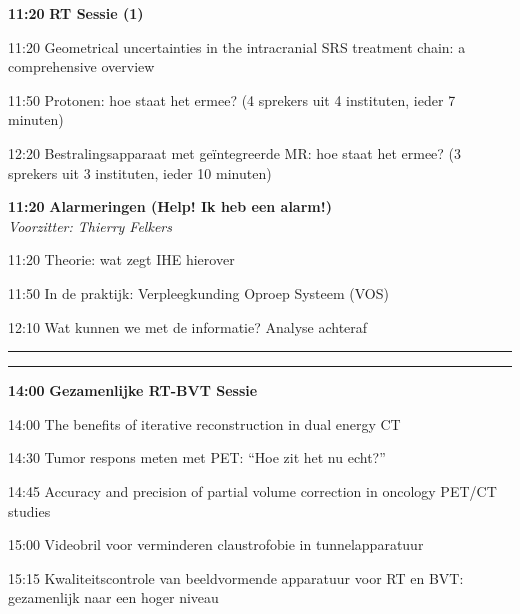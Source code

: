 \documentclass[a4paper,10pt]{report}
\begin{document}
\begin{multicols*}{3}
\begin{packed_enum}
\item[\textbf{11:20}] \textbf{RT Sessie (1)}
\item[11:20] Geometrical uncertainties in the intracranial SRS treatment chain: a comprehensive overview
\item[11:50] Protonen: hoe staat het ermee? (4 sprekers uit 4 instituten, ieder 7 minuten)
\item[12:20] Bestralingsapparaat met geïntegreerde MR: hoe staat het ermee? (3 sprekers uit 3 instituten, ieder 10 minuten)
\end{packed_enum} %

\vfill

\begin{packed_enum}
\item[\textbf{11:20}] \textbf{Alarmeringen (Help! Ik heb een alarm!)}\\\textit{Voorzitter: Thierry Felkers}
\item[11:20] Theorie: wat zegt IHE hierover
\item[11:50] In de praktijk: Verpleegkunding Oproep Systeem (VOS)
\item[12:10] Wat kunnen we met de informatie? Analyse achteraf
\end{packed_enum} %

\columnbreak

\hrule \vspace{2mm}
\vspace{2mm}\hrule\strut

\begin{packed_enum}
\item[\textbf{14:00}] \textbf{Gezamenlijke RT-BVT Sessie}
\item[14:00] The benefits of iterative reconstruction in dual energy CT
\item[14:30] Tumor respons meten met PET: “Hoe zit het nu echt?”
\item[14:45] Accuracy and precision of partial volume cor\-rection in oncology PET/CT studies
\item[15:00] Videobril voor verminderen claustrofobie in tun\-nel\-ap\-pa\-ra\-tuur
\item[15:15] Kwaliteitscontrole van beeldvormende apparatuur voor RT en BVT: gezamenlijk naar een hoger niveau
\end{packed_enum} %


\end{multicols*}
\end{document}
